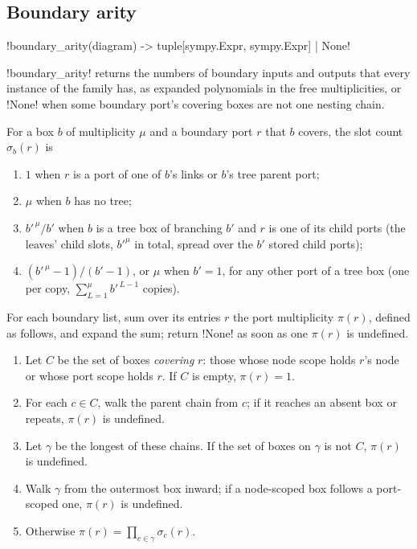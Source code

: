 \subsection{Boundary arity}\label{sec:diagrams-arity}

\begin{signature}
\py!boundary_arity(diagram) -> tuple[sympy.Expr, sympy.Expr] | None!
\end{signature}

\py!boundary_arity! returns the numbers of boundary inputs and outputs that every instance of the family has, as expanded polynomials in the free multiplicities, or \py!None! when some boundary port's covering boxes are not one nesting chain.

\begin{definition}\label{def:diagrams-slot-count}
For a box $b$ of multiplicity $\mu$ and a boundary port $r$ that $b$ covers, the slot count $\sigma_b(r)$ is
\begin{enumerate}
\item $1$ when $r$ is a port of one of $b$'s links or $b$'s tree parent port;
\item $\mu$ when $b$ has no tree;
\item $b'^{\,\mu}/b'$ when $b$ is a tree box of branching $b'$ and $r$ is one of its child ports (the leaves' child slots, $b'^{\mu}$ in total, spread over the $b'$ stored child ports);
\item $(b'^{\,\mu}-1)/(b'-1)$, or $\mu$ when $b'=1$, for any other port of a tree box (one per copy, $\sum_{L=1}^{\mu}b'^{\,L-1}$ copies).
\end{enumerate}
\end{definition}

\begin{algorithm}\label{alg:diagrams-arity}
For each boundary list, sum over its entries $r$ the port multiplicity $\pi(r)$, defined as follows, and expand the sum; return \py!None! as soon as one $\pi(r)$ is undefined.
\begin{enumerate}
\item Let $C$ be the set of boxes \emph{covering} $r$: those whose node scope holds $r$'s node or whose port scope holds $r$. If $C$ is empty, $\pi(r)=1$.
\item For each $c\in C$, walk the parent chain from $c$; if it reaches an absent box or repeats, $\pi(r)$ is undefined.
\item Let $\gamma$ be the longest of these chains. If the set of boxes on $\gamma$ is not $C$, $\pi(r)$ is undefined.
\item Walk $\gamma$ from the outermost box inward; if a node-scoped box follows a port-scoped one, $\pi(r)$ is undefined.
\item Otherwise $\pi(r)=\prod_{c\in\gamma}\sigma_c(r)$.
\end{enumerate}
\end{algorithm}

